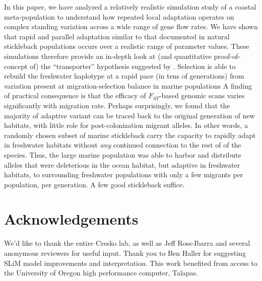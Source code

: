 \documentclass{article}
\begin{document}
In this paper, we have analyzed a relatively realistic simulation study of a coastal meta-population to 
understand how repeated local adaptation operates on complex standing variation across a wide range of gene flow rates.
We have shown that rapid and parallel adaptation similar to that documented in natural stickleback populations
occurs over a realistic range of parameter values.
These simulations therefore provide an in-depth look at (and quantitative proof-of-concept of)
the ``transporter'' hypothesis suggested by \citet{schluter2009genetics}.
Selection is able to rebuild the freshwater haplotype at a rapid pace (in tens of generations) from variation present at migration-selection balance in marine populations 
A finding of practical consequence is that the efficacy of $F_{ST}$-based genomic scans varies significantly with migration rate.
Perhaps surprisingly, we found that the majority of adaptive variant can be traced back to the original generation of new habitats,
with little role for post-colonization migrant alleles. 
In other words, a randomly chosen subset of marine stickleback carry the capacity to rapidly adapt in freshwater habitats without \emph{any} continued connection to the rest of of the species.
Thus, the large marine population was able to harbor and distribute alleles that were deleterious in the ocean habitat, but adaptive in freshwater habitats, to surrounding freshwater populations with only a few migrants per population, per generation. A few good stickleback suffice.


\section *{Acknowledgements}

We'd like to thank the entire Cresko lab, as well as Jeff Ross-Ibarra and several anonymous reviewers for useful input.
Thank you to Ben Haller for suggesting SLiM model improvements and interpretation. 
This work benefited from access to the University of Oregon high performance computer, Talapas. 


{}

\clearpage
\appendix
\setcounter{table}{0}
\renewcommand{\thetable}{S\arabic{table}}
\setcounter{figure}{0}
\renewcommand{\thefigure}{S\arabic{figure}}
\end{document}
